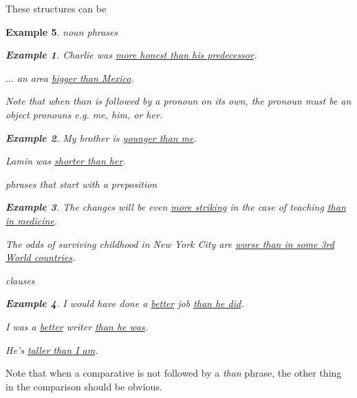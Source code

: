 \documentclass[oneside]{book}
\numberwithin{equation}{section}
\newtheorem{example}{Example}[section]
\begin{document}
%
These structures can be
\begin{example}
    noun phrases
    \begin{example}
        Charlie was \underline{more honest than his predecessor}.
        
        $\ldots$ an area \underline{bigger than Mexico}.
    \end{example}
    Note that when \textit{than} is followed by a pronoun on its own, the pronoun must be an object pronouns e.g. \textit{me, him}, or \textit{her}.
    \begin{example}
        My brother is \underline{younger than me}.
        
        Lamin was \underline{shorter than her}.
    \end{example}
    \item phrases that start with a preposition
    \begin{example}
        The changes will be even \underline{more striking} in the case of teaching \underline{than in medicine}.
        
        The odds of surviving childhood in New York City are \underline{worse than in some 3rd World countries}.
    \end{example}
    \item clauses
    \begin{example}
        I would have done a \underline{better} job \underline{than he did}.
        
        I was a \underline{better} writer \underline{than he was}.
        
        He's \underline{taller than I am}.
    \end{example}
\end{example}
Note that when a comparative is not followed by a \textit{than} phrase, the other thing in the comparison should be obvious.
\end{document}
